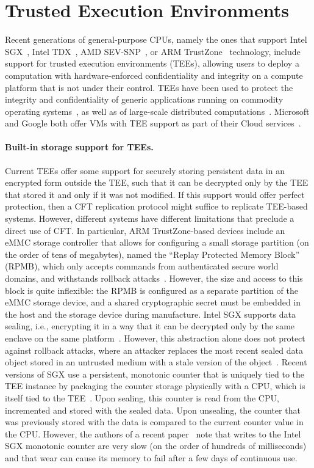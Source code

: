 \section{Trusted Execution Environments}
Recent generations of general-purpose CPUs, namely the ones that
support Intel SGX~\cite{intelsgx}, Intel TDX~\cite{inteltdx}, AMD
SEV-SNP~\cite{amdsev,amdsev-snp}, or ARM TrustZone~\cite{armTZ}
technology, include support for trusted execution environments (TEEs),
allowing users to deploy a computation with hardware-enforced
confidentiality and integrity on a compute platform that is not under
their control.  TEEs have been used to protect the integrity and
confidentiality of generic applications running on commodity operating
systems~\cite{haven}, as well as of large-scale distributed
computations~\cite{vc3}. Microsoft and Google both offer VMs with TEE
support as part of their Cloud
services~\cite{azure-conf,google-confVM}.

\paragraph{Built-in storage support for TEEs.}
Current TEEs offer some support for securely storing persistent
data in an encrypted form outside the TEE, such that it can be
decrypted only by the TEE that stored it and only if it was not
modified. If this support would offer perfect protection, then a
CFT replication protocol might suffice to replicate TEE-based
systems. However, different systems have different limitations
that preclude a direct use of CFT.  In particular, ARM
TrustZone-based devices include an eMMC storage controller that
allows for configuring a small storage partition (on the order of
tens of megabytes), named the ``Replay Protected Memory Block''
(RPMB), which only accepts commands from authenticated secure
world domains, and withstands rollback attacks~\cite{rpmb}.
However, the size and access to this block is quite inflexible:
the RPMB is configured as a separate partition of the eMMC
storage device, and a shared cryptographic secret must be
embedded in the host and the storage device during manufacture.
Intel SGX supports data sealing, i.e., encrypting it in a way
that it can be decrypted only by the same enclave on the same
platform~\cite{intelsgx}. However, this abstraction alone does
not protect against rollback attacks, where an attacker replaces
the most recent sealed data object stored in an untrusted medium
with a stale version of the object~\cite{memoir}. Recent versions
of SGX use a persistent, monotonic counter that is uniquely tied
to the TEE instance by packaging the counter storage physically
with a CPU, which is itself tied to the TEE~\cite{intelsgx}. Upon
sealing, this counter is read from the CPU, incremented and
stored with the sealed data. Upon unsealing, the counter that was
previously stored with the data is compared to the current
counter value in the CPU. However, the authors of a recent
paper~\cite{rote} note that writes to the Intel SGX monotonic
counter are very slow (on the order of hundreds of milliseconds)
and that wear can cause its memory to fail after a few days of
continuous use.

